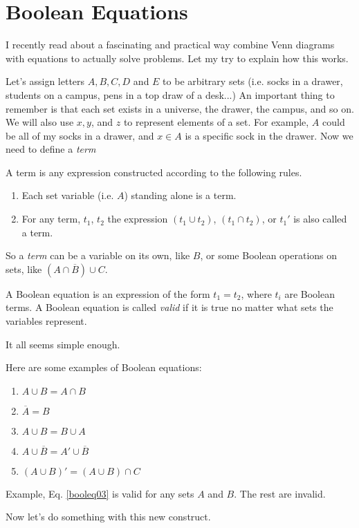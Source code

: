 \section{Boolean Equations}
I recently read about a fascinating and practical way combine Venn diagrams with equations to actually solve problems.  Let my try to explain how this works.  

Let's assign letters $A, B, C, D$ and $E$ to be arbitrary sets (i.e. socks in a drawer, students on a campus, pens in a top draw of a desk...) An important thing to remember is that each set exists in a universe, the drawer, the campus, and so on.  We will also use $x, y$, and $z$ to represent elements of a set. For example, $A$ could be all of my socks in a drawer, and $x\in A$ is a specific sock in the drawer.  Now we need to define a \emph{term}
\begin{definition}[Term]  A term is any expression constructed according to the following rules.
\begin{enumerate}
\item Each set variable (i.e. $A$) standing alone is a term.
\item For any term, $t_1$, $t_2$ the expression $(t_1\cup t_2)$, $(t_1\cap t_2)$, or $t_1'$ is also called a term.
\end{enumerate}
\end{definition}
So a \emph{term} can be a variable on its own, like $B$, or some Boolean operations on sets, like $(A \cap \overline B)\cup C$.

\begin{definition}  A Boolean equation is an expression of the form $t_1=t_2$, where $t_i$ are Boolean terms.  A Boolean equation is called \emph{valid} if it is true no matter what sets the variables represent.
\end{definition}

It all seems simple enough.  
\begin{example}
Here are some examples of Boolean equations:
\begin{enumerate}
\item $A \cup B = A \cap B$
\item $\overline A = B$
\item $A \cup B = B \cup A$ \label{booleq03}
\item $A \cup \overline B = A' \cup \overline B$
\item $(A \cup B)' = (A \cup B)\cap C$
\end{enumerate}
Example, Eq. \ref{booleq03} is valid for any sets $A$ and $B$.  The rest are invalid.  
\end{example}
Now let's do something with this new construct.  

